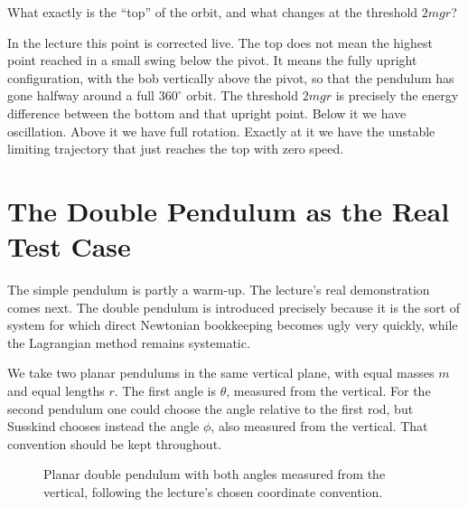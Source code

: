 What exactly is the ``top'' of the orbit, and what changes at the threshold \(2mgr\)?

In the lecture this point is corrected live. The top does not mean the highest point reached in a small swing below the pivot. It means the fully upright configuration, with the bob vertically above the pivot, so that the pendulum has gone halfway around a full \(360^\circ\) orbit. The threshold \(2mgr\) is precisely the energy difference between the bottom and that upright point. Below it we have oscillation. Above it we have full rotation. Exactly at it we have the unstable limiting trajectory that just reaches the top with zero speed.

\section{The Double Pendulum as the Real Test Case}

The simple pendulum is partly a warm-up. The lecture's real demonstration comes next. The double pendulum is introduced precisely because it is the sort of system for which direct Newtonian bookkeeping becomes ugly very quickly, while the Lagrangian method remains systematic.

We take two planar pendulums in the same vertical plane, with equal masses \(m\) and equal lengths \(r\). The first angle is \(\theta\), measured from the vertical. For the second pendulum one could choose the angle relative to the first rod, but Susskind chooses instead the angle \(\phi\), also measured from the vertical. That convention should be kept throughout.

\begin{figure}[h]
\centering
{}
\caption{Planar double pendulum with both angles measured from the vertical, following the lecture's chosen coordinate convention.}
\end{figure}

